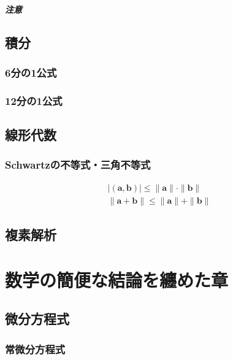 \documentclass[]{jreport}
\begin{document}
\subsubsection{注意}

\chapter{積分}
\section{6分の1公式}

\section{12分の1公式}

\chapter{線形代数}
\section{Schwartzの不等式・三角不等式}
\begin{equation}
    \begin{array}{l}
        |(\bm{a}, \bm{b})|\le\|\bm{a}\|\cdot\|\bm{b}\|\\
        \|\bm{a}+\bm{b}\|\le\|\bm{a}\|+\|\bm{b}\|
    \end{array}
\end{equation}

\chapter{複素解析}

\part{数学の簡便な結論を纏めた章}
\chapter{微分方程式}
\section{常微分方程式}
\end{document}
